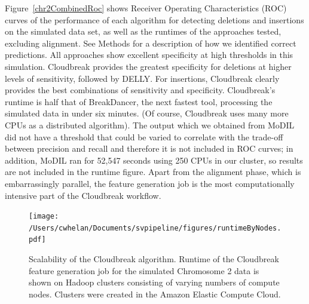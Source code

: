 Figure~\ref{chr2CombinedRoc} shows Receiver Operating Characteristics (ROC) curves of the performance of each algorithm for detecting deletions and insertions on the simulated data set, as well as the runtimes of the approaches tested, excluding alignment. See Methods for a description of how we identified correct predictions. All approaches show excellent specificity at high thresholds in this simulation. Cloudbreak provides the greatest specificity for deletions at higher levels of sensitivity, followed by DELLY. For insertions, Cloudbreak clearly provides the best combinations of sensitivity and specificity. Cloudbreak's runtime is half that of BreakDancer, the next fastest tool, processing the simulated data in under six minutes. (Of course, Cloudbreak uses many more CPUs as a distributed algorithm).  The output which we obtained from MoDIL did not have a threshold that could be varied to correlate with the trade-off between precision and recall and therefore it is not included in ROC curves; in addition, MoDIL ran for 52,547 seconds using 250 CPUs in our cluster, so results are not included in the runtime figure. Apart from the alignment phase, which is embarrassingly parallel, the feature generation job is the most computationally intensive part of the Cloudbreak workflow. 

\begin{figure}
\centering
\texttt{[image: /Users/cwhelan/Documents/svpipeline/figures/runtimeByNodes.pdf]}
\caption{Scalability of the Cloudbreak algorithm. Runtime of the Cloudbreak feature generation job for the simulated Chromosome 2 data is shown on Hadoop clusters consisting of varying numbers of compute nodes. Clusters were created in the Amazon Elastic Compute Cloud.}
\label{scalability}
\end{figure}

